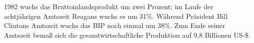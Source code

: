 \documentclass{article}
\begin{document}

1982 wuchs das Bruttoinlandsprodukt um zwei Prozent; im Laufe der achtjährigen Amtszeit Reagans wuchs es um 31\%. Während Präsident Bill Clintons Amtszeit wuchs das BIP noch einmal um 38\%. Zum Ende seiner Amtszeit bemaß sich die gesamtwirtschaftliche Produktion auf 9,8 Billionen US-\$.
\end{document}
